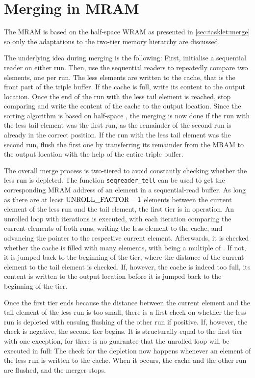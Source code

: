 \section{Merging in MRAM}
\label{sec:mram:merge}

The MRAM \MS{} is based on the half-space WRAM \MS{} as presented in \cref{sec:tasklet:merge} so only the adaptations to the two-tier memory hierarchy are discussed.

The underlying idea during merging is the following:
First, initialise a sequential reader on either run.
Then, use the sequential readers to repeatedly compare two elements, one per run.
The less elements are written to the cache, that is the front part of the triple buffer.
If the cache is full, write its content to the output location.
Once the end of the run with the less tail element is reached, stop comparing and write the content of the cache to the output location.
Since the sorting algorithm is based on half-space \MS{}, the merging is now done if the run with the less tail element was the first run, as the remainder of the second run is already in the correct position.
If the run with the less tail element was the second run, flush the first one by transferring its remainder from the MRAM to the output location with the help of the entire triple buffer.

The overall merge process is two-tiered to avoid constantly checking whether the less run is depleted.
The function \lstinline|seqreader_tell| can be used to get the corresponding MRAM address of an element in a sequential-read buffer.
As long as there are at least \(\unrollfactor{} - 1\) elements between the current element of the less run and the tail element, the first tier is in operation.
An unrolled loop with \unrollfactor{} iterations is executed, with each iteration comparing the current elements of both runs, writing the less element to the cache, and advancing the pointer to the respective current element.
Afterwards, it is checked whether the cache is filled with \unrolledcachelength{} many elements, with \unrolledcachelength{} being a multiple of \unrollfactor{}.
If not, it is jumped back to the beginning of the tier, where the distance of the current element to the tail element is checked.
If, however, the cache is indeed too full, its content is written to the output location before it is jumped back to the beginning of the tier.

Once the first tier ends because the distance between the current element and the tail element of the less run is too small, there is a first check on whether the less run is depleted with ensuing flushing of the other run if positive.
If, however, the check is negative, the second tier begins.
It is structurally equal to the first tier with one exception, for there is no guarantee that the unrolled loop will be executed in full:
The check for the depletion now happens whenever an element of the less run is written to the cache.
When it occurs, the cache and the other run are flushed, and the merger stops.

